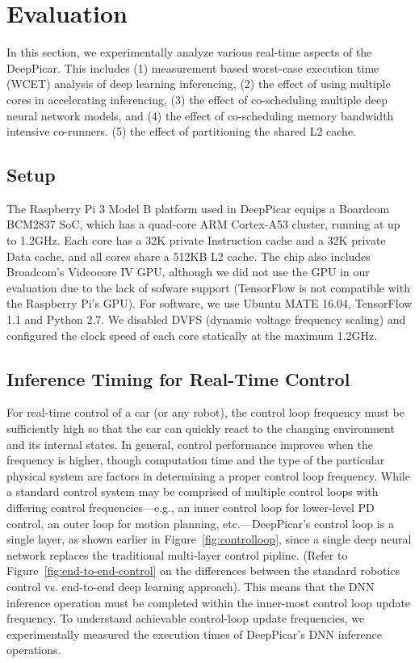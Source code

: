 
\section{Evaluation}\label{sec:evaluation}

In this section, we experimentally analyze various real-time aspects
of the DeepPicar. This includes
(1) measurement based worst-case execution time (WCET) analysis of
deep learning inferencing,
(2) the effect of using multiple cores in accelerating inferencing,
(3) the effect of co-scheduling multiple deep neural network models,
and 
(4) the effect of co-scheduling memory bandwidth intensive co-runners.
(5) the effect of partitioning the shared L2 cache.

\subsection{Setup}

The Raspberry Pi 3 Model B platform used in DeepPicar equips a Boardcom
BCM2837 SoC, which has a quad-core ARM Cortex-A53 cluster,
running at up to 1.2GHz. Each core has a 32K private Instruction cache
and a 32K private Data cache, and all cores share a 512KB L2 cache.
The chip also includes Broadcom's Videocore IV
GPU, although we did not use the GPU in our evaluation due to the lack
of sofware support (TensorFlow is not compatible with the Raspberry Pi's GPU).
For software, we use Ubuntu MATE 16.04, TensorFlow 1.1 and Python
2.7. We disabled DVFS (dynamic voltage frequency scaling) and
configured the clock speed of each core statically at the maximum 1.2GHz.

\subsection{Inference Timing for Real-Time Control}

For real-time control of a car (or any robot), the control loop
frequency must be sufficiently high so that the car can quickly
react to the changing environment and its internal states. In general,
control performance improves when the frequency is higher, though
computation time and the type of the particular physical system are
factors in determining a proper control loop frequency. While a standard
control system may be comprised of multiple control loops with
differing control frequencies---e.g., an inner control loop for lower-level
PD control, an outer loop for motion planning, etc.---DeepPicar's
control loop is a single layer, as shown earlier in
Figure~\ref{fig:controlloop}, since a single deep neural network
replaces the traditional multi-layer control pipline. (Refer to
Figure~\ref{fig:end-to-end-control} on the differences between the
standard robotics control vs. end-to-end deep learning approach).
This means that the DNN inference operation must be completed
within the inner-most control loop update frequency. To understand
achievable control-loop update frequencies, we experimentally measured
the execution times of DeepPicar's DNN inference operations.

